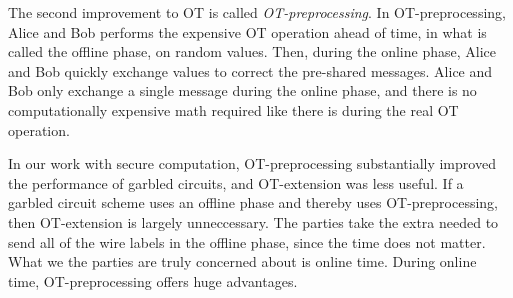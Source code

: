 The second improvement to OT is called \textit{OT-preprocessing}.
In OT-preprocessing, Alice and Bob performs the expensive OT operation ahead of time, in what is called the offline phase, on random values.
Then, during the online phase, Alice and Bob quickly exchange values to correct the pre-shared messages.
Alice and Bob only exchange a single message during the online phase, and there is no computationally expensive math required like there is during the real OT operation.

In our work with secure computation, OT-preprocessing substantially improved the performance of garbled circuits, and OT-extension was less useful.
If a garbled circuit scheme uses an offline phase and thereby uses OT-preprocessing, then OT-extension is largely unneccessary.
The parties take the extra needed to send all of the wire labels in the offline phase, since the time does not matter.
What we the parties are truly concerned about is online time.
During online time, OT-preprocessing offers huge advantages.

